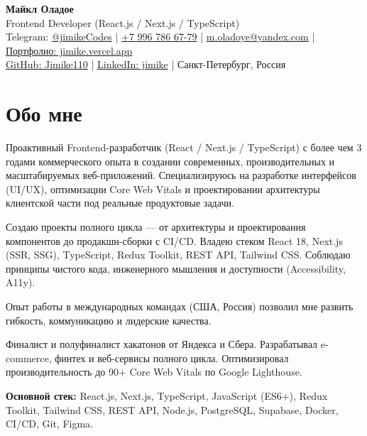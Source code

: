 \documentclass[a4paper,11pt]{article}
\begin{document}
\begin{center}
    {\Huge \textbf{Майкл Оладое}} \\[5pt]
    {\large Frontend Developer (React.js / Next.js / TypeScript)} \\[6pt]
    Telegram: \href {https://t.me/jimikeCodes}{@jimikeCodes} \quad|\quad
    \href{tel:+79967866779}{+7 996 786 67-79} \quad|\quad
    \href{mailto:m.oladoye@yandex.com}{m.oladoye@yandex.com} \quad|\quad
    \href{https://jimike.vercel.app}{Портфолио: jimike.vercel.app} \\[4pt]
    \href{https://github.com/Jimike110}{GitHub: Jimike110} \quad|\quad
    \href{https://www.linkedin.com/in/jimike}{LinkedIn: jimike} \quad|\quad
    Санкт-Петербург, Россия
\end{center}


\section*{Обо мне}
Проактивный Frontend-разработчик (React / Next.js / TypeScript) с более чем 3 годами коммерческого опыта в создании современных, производительных и масштабируемых веб-приложений.  
Специализируюсь на разработке интерфейсов (UI/UX), оптимизации Core Web Vitals и проектировании архитектуры клиентской части под реальные продуктовые задачи.  

Создаю проекты полного цикла — от архитектуры и проектирования компонентов до продакшн-сборки с CI/CD.  
Владею стеком React 18, Next.js (SSR, SSG), TypeScript, Redux Toolkit, REST API, Tailwind CSS. Соблюдаю принципы чистого кода, инженерного мышления и доступности (Accessibility, A11y).  

Опыт работы в международных командах (США, Россия) позволил мне развить гибкость, коммуникацию и лидерские качества.  

Финалист и полуфиналист хакатонов от Яндекса и Сбера.  
Разрабатывал e-commerce, финтех и веб-сервисы полного цикла.  
Оптимизировал производительность до 90+ Core Web Vitals по Google Lighthouse.  

\textbf{Основной стек:} React.js, Next.js, TypeScript, JavaScript (ES6+), Redux Toolkit, Tailwind CSS, REST API, Node.js, PostgreSQL, Supabase, Docker, CI/CD, Git, Figma.
\end{document}
